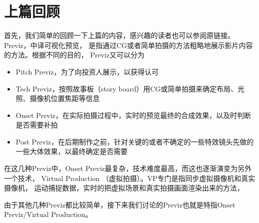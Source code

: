 \section{上篇回顾}
首先，我们简单的回顾一下上篇的内容，感兴趣的读者也可以参阅原链接。
Previz，中译可视化预览， 是指通过CG或者简单拍摄的方法粗略地展示影片内容的方法。根据不同的目的， Previz又可以分为
\begin{itemize}
	\item Pitch Previz，为了向投资人展示，以获得认可
	\item Tech Previz，按照故事板（story board）用CG或简单拍摄来确定布局、光照、摄像机位置焦距等信息
	\item Onset Previz，在实际拍摄过程中，实时的预览最终的合成效果，以及时判断是否需要补拍
	\item Post Previz，在后期制作之前，针对关键的或者不确定的一些特效镜头先做的一些大体效果，以最终确定是否需要
\end{itemize}

在这几种Previz中，Onset Previz最复杂，技术难度最高，而这也逐渐演变为另外一个技术， Virtual Production （虚拟拍摄）。VP专门是指同步虚拟摄像机和真实摄像机， 运动捕捉数据，实时的把虚拟场景和真实拍摄画面渲染出来的方法，

由于其他几种Previz都比较简单，接下来我们讨论的Previz也就是特指Onset Previz/Virtual Production。
